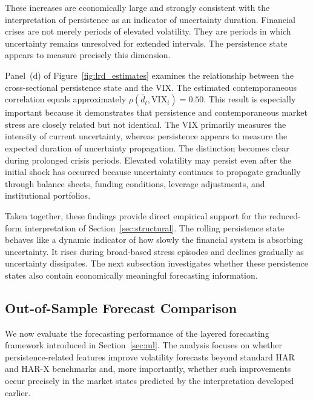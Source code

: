 \documentclass[unnumsec,webpdf,contemporary,large]{oup-authoring-template}%
\theoremstyle{thmstyleone}%
\theoremstyle{thmstyletwo}%
\theoremstyle{thmstylethree}%
\begin{document}
These increases are economically large and strongly consistent with the
interpretation of persistence as an indicator of uncertainty duration.
Financial crises are not merely periods of elevated volatility. They are
periods in which uncertainty remains unresolved for extended intervals. The
persistence state appears to measure precisely this dimension.

Panel~(d) of Figure~\ref{fig:lrd_estimates} examines the relationship
between the cross-sectional persistence state and the VIX. The estimated
contemporaneous correlation equals approximately
$\rho(\overline d_t, \text{VIX}_t) = 0.50$. This result is especially important
because it demonstrates that persistence and contemporaneous market stress
are closely related but not identical. The VIX primarily measures the
intensity of current uncertainty, whereas persistence appears to measure
the expected duration of uncertainty propagation. The distinction becomes
clear during prolonged crisis periods. Elevated volatility may persist
even after the initial shock has occurred because uncertainty continues to
propagate gradually through balance sheets, funding conditions, leverage
adjustments, and institutional portfolios.



Taken together, these findings provide direct empirical support for the
reduced-form interpretation of Section~\ref{sec:structural}. The rolling
persistence state behaves like a dynamic indicator of how slowly the
financial system is absorbing uncertainty. It rises during broad-based
stress episodes and declines gradually as uncertainty dissipates. The next
subsection investigates whether these persistence states also contain
economically meaningful forecasting information.

\subsection{Out-of-Sample Forecast Comparison}

We now evaluate the forecasting performance of the layered forecasting
framework introduced in Section~\ref{sec:ml}. The analysis focuses on
whether persistence-related features improve volatility forecasts beyond
standard HAR and HAR-X benchmarks and, more importantly, whether such
improvements occur precisely in the market states predicted by the
interpretation developed earlier.
\end{document}
